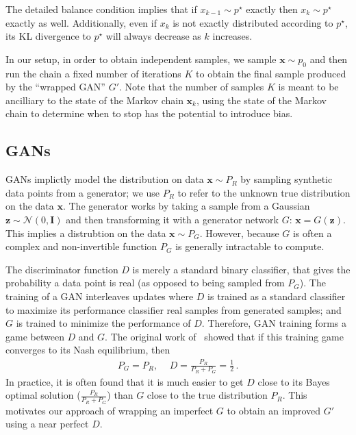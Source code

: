 \documentclass{article}
\renewcommand{\vec}[1]{{\boldsymbol{\mathbf{#1}}}} %
\newcommand{\mat}[1]{{\ensuremath{\mathbf{#1}}}} %
\newcommand{\sample}{\sim}
\newcommand{\norm}{\mathcal{N}}
\newcommand{\target}{{p^\star}}
\newcommand{\pinit}{{p_0}}
\begin{document}
The detailed balance condition implies that if $x_{k-1} \sample \target$ exactly then $x_k \sample \target$ exactly as well.
Additionally, even if $x_k$ is not exactly distributed according to $\target$, its KL divergence to $\target$ will always decrease as $k$ increases.  %

In our setup, in order to obtain independent samples, we sample $\vec x \sample \pinit$ and then run the chain a fixed number of iterations $K$ to obtain the final sample produced by the ``wrapped GAN'' $G'$.
Note that the number of samples $K$ is meant to be ancilliary to the state of the Markov chain $\vec x_k$, using the state of the Markov chain to determine when to stop has the potential to introduce bias.  %

\subsection{GANs}

GANs implictly model the distribution on data $\vec x \sample P_R$ by sampling synthetic data points from a generator; we use $P_R$ to refer to the unknown true distribution on the data $\vec x$.
The generator works by taking a sample from a Gaussian $\vec z \sample \norm(0,\mat I)$ and then transforming it with a generator network $G$: $\vec x = G(\vec z)$.
This implies a distrubtion on the data $\vec x \sample P_G$.  %
However, because $G$ is often a complex and non-invertible function $P_G$ is generally intractable to compute.

The discriminator function $D$ is merely a standard binary classifier, that gives the probability a data point is real (as opposed to being sampled from $P_G$)\@.
The training of a GAN interleaves updates where $D$ is trained as a standard classifier to maximize its performance classifier real samples from generated samples; and $G$ is trained to minimize the performance of $D$.
Therefore, GAN training forms a game between $D$ and $G$.
The original work of~\citet{} showed that if this training game converges to its Nash equilibrium, then
\begin{align}
  P_G = P_R,\, \quad D = \frac{P_R}{P_R + P_G} = \frac{1}{2}\,.
\end{align}
In practice, it is often found that it is much easier to get $D$ close to its Bayes optimal solution ($\tfrac{P_R}{P_R + P_G}$) than $G$ close to the true distribution $P_R$.
This motivates our approach of wrapping an imperfect $G$ to obtain an improved $G'$ using a near perfect $D$.
\end{document}
